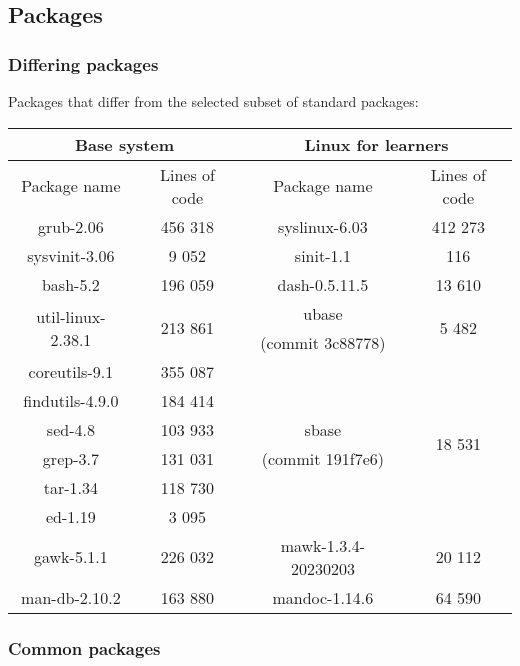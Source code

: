 \subsection{Packages}\label{Packages}

\subsubsection{Differing packages}

Packages that differ from the selected subset of standard packages:

\begin{center}
    \begin{tabular}{|c|c||c|c|}
        \hline
        \multicolumn{2}{|c||}{Base system} & \multicolumn{2}{|c|}{Linux for learners} \\
        \hline
        \hline
        Package name & Lines of code & Package name & Lines of code \\
        \hline
        \hline
        grub-2.06 & 456 318 & syslinux-6.03 & 412 273 \\
        \hline
        sysvinit-3.06 & 9 052 & sinit-1.1 & 116 \\
        \hline
        bash-5.2 & 196 059 & dash-0.5.11.5 & 13 610 \\
        \hline
        \multirow{2}{*}{util-linux-2.38.1} & \multirow{2}{*}{213 861} & ubase & \multirow{2}{*}{5 482} \\
        & & (commit 3c88778) & \\
        \hline
        coreutils-9.1 & 355 087 & & \multirow{6}{*}{18 531} \\
        findutils-4.9.0 & 184 414 & & \\
        sed-4.8 & 103 933 & sbase & \\
        grep-3.7 & 131 031 & (commit 191f7e6) & \\
        tar-1.34 & 118 730 & & \\
        ed-1.19 & 3 095 & & \\
        \hline
        gawk-5.1.1 & 226 032 & mawk-1.3.4-20230203 & 20 112 \\
        \hline
        man-db-2.10.2 & 163 880 & mandoc-1.14.6 & 64 590 \\
        \hline
    \end{tabular}
\end{center}

\subsubsection{Common packages}


